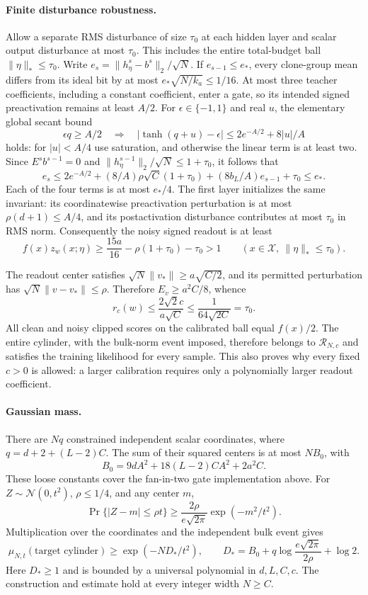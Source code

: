 \paragraph{Finite disturbance robustness.}
Allow a separate RMS disturbance of size $\tau_0$ at each hidden layer and
scalar output disturbance at most $\tau_0$. This includes the entire
total-budget ball $\|\eta\|_*\le\tau_0$.
Write $e_s=\|h^s_\eta-b^s\|_2/\sqrt N$.
If $e_{s-1}\le e_*$, every clone-group mean differs from its ideal bit by
at most $e_*\sqrt{N/k_a}\le1/16$. At most three teacher coefficients,
including a constant coefficient, enter a gate, so its intended signed
preactivation remains at least $A/2$.
For $\epsilon\in\{-1,1\}$ and real $u$, the elementary global secant bound
\[
 \epsilon q\ge A/2
 \quad\Longrightarrow\quad
 |\tanh(q+u)-\epsilon|\le2e^{-A/2}+8|u|/A
\]
holds: for $|u|<A/4$ use saturation, and otherwise the linear term is at
least two. Since $E^sb^{s-1}=0$ and
$\|h^{s-1}_\eta\|_2/\sqrt N\le1+\tau_0$, it follows that
\[
 e_s\le2e^{-A/2}+
          (8/A)\rho\sqrt C(1+\tau_0)
          +(8b_L/A)e_{s-1}+\tau_0\le e_*.
\]
Each of the four terms is at most $e_*/4$.
The first layer initializes the same invariant: its coordinatewise
preactivation perturbation is at most $\rho(d+1)\le A/4$, and its
postactivation disturbance contributes at most $\tau_0$ in RMS norm.
Consequently the noisy signed readout is at least
\[
 f(x)z_w(x;\eta)
 \ge\frac{15a}{16}-\rho(1+\tau_0)-\tau_0>1
 \qquad(x\in\mathcal X,\ \|\eta\|_*\le\tau_0).
\]

The readout center satisfies $\sqrt N\|v_*\|\ge a\sqrt{C/2}$, and its
permitted perturbation has $\sqrt N\|v-v_*\|\le\rho$.
Therefore $E_v\ge a^2C/8$, whence
\[
 r_c(w)\le\frac{2\sqrt2c}{a\sqrt C}
       \le\frac1{64\sqrt{2C}}=\tau_0.
\]
All clean and noisy clipped scores on the calibrated ball equal $f(x)/2$.
The entire cylinder, with the bulk-norm event imposed, therefore belongs
to $\mathcal R_{N,c}$ and satisfies the training likelihood for every sample.
This also proves why every fixed $c>0$ is allowed: a larger calibration
requires only a polynomially larger readout coefficient.

\paragraph{Gaussian mass.}
There are $Nq$ constrained independent scalar coordinates, where
$q=d+2+(L-2)C$. The sum of their squared centers is at most $NB_0$, with
\[
 B_0=9dA^2+18(L-2)CA^2+2a^2C.
\]
These loose constants cover the fan-in-two gate implementation above.
For $Z\sim\mathcal N(0,t^2)$, $\rho\le1/4$, and any center $m$,
\[
 \Pr\{|Z-m|\le\rho t\}
 \ge\frac{2\rho}{e\sqrt{2\pi}}\exp(-m^2/t^2).
\]
Multiplication over the coordinates and the independent bulk event gives
\begin{equation}\label{eq:standalone-cylinder-mass}
 \mu_{N,t}(\text{target cylinder})
 \ge\exp(-ND_*/t^2),\qquad
 D_*=B_0+q\log\frac{e\sqrt{2\pi}}{2\rho}+\log2.
\end{equation}
Here $D_*\ge1$ and is bounded by a universal polynomial in $d,L,C,c$.
The construction and estimate hold at every integer width $N\ge C$.
